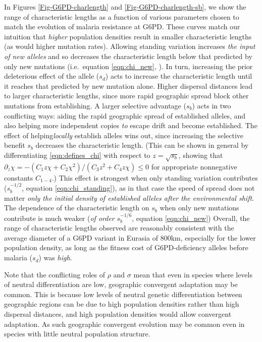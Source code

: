 \documentclass{article}
\newcommand{\gc}[1]{{\it\color{blue}#1}}
\newcommand{\mfp}[1]{{\it\color{red}#1}}
\begin{document}
In Figures \ref{Fig-G6PD-charlength} and \ref{Fig-G6PD-charlength-sb}, we show the range of characteristic lengths as a function 
of various parameters chosen to match the evolution of malaria
resistance at G6PD. 
These curves match our intuition that \gc{higher} population densities result in
smaller characteristic lengths (as would higher mutation rates). 
Allowing standing variation increases \gc{the 
input of new alleles} and so decreases the characteristic length below that predicted
by only new mutations (i.e.\ equation \eqref{eqn:chi_new}, \citet{ralphcoop2010}).
In turn, increasing the prior deleterious effect of the allele ($s_d$)
acts to increase the
characteristic length until it reaches that predicted by new mutation alone. 
Higher dispersal distances lead to larger characteristic lengths, 
since more rapid geographic spread block other mutations from establishing. 
A larger selective advantage ($s_b$) acts in two conflicting
ways: aiding the rapid geographic spread of established alleles, and also helping more independent copies
\mfp{to} escape drift and become established. 
The effect of helping\gc{locally} establish alleles wins out, since increasing the selective benefit $s_b$ decreases the characteristic length. 
 (This can be shown in general by differentiating \eqref{eqn:defines_chi} with respect to $z=\sqrt{s_b}$,
showing that $\partial_{z} \chi = - ( C_1 z \chi + C_2 \chi^2 )/(C_3 z^2 + C_4 z \chi ) \le 0$ for appropriate nonnegative constants $C_{1-4}$.) 
This effect is strongest when only standing variation contributes ($s_b^{-1/2}$, equation \eqref{eqn:chi_standing}), 
as in that case the speed of spread does not matter \mfp{only the
  initial density of established alleles after the environmental shift}. 
The dependence of the characteristic length on $s_b$ when only new
mutations contribute is much weaker (\gc{of order} $s_b^{-1/6}$, equation \eqref{eqn:chi_new})
Overall, the range of characteristic lengths observed are reasonably
consistent with the average diameter of a G6PD variant in Eurasia of
800km, especially for the lower population density, as long as the
fitness cost of G6PD-deficiency alleles before malaria ($s_d$) was \mfp{high}. 

Note that the conflicting roles of $\rho$ and $\sigma$ mean that even in
species where levels of neutral differentiation are low, geographic
convergent adaptation may be common. This is because low levels of
neutral genetic differentiation between geographic regions can be due to high population
densities rather than high dispersal distances, and high population
densities would allow convergent adaptation. As such geographic convergent
evolution may be common even in species with little neutral population structure.
\end{document}
